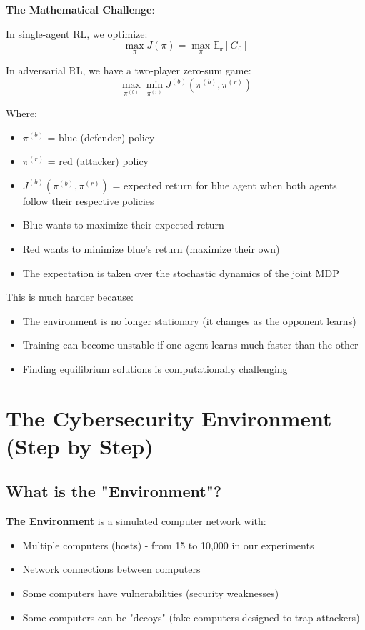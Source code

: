 \documentclass[11pt]{article}
\begin{document}
\begin{mathdetails}
\textbf{The Mathematical Challenge}:

In single-agent RL, we optimize:
$$\max_{\pi} J(\pi) = \max_{\pi} \mathbb{E}_{\pi}\left[G_0\right]$$

In adversarial RL, we have a two-player zero-sum game:
$$\max_{\pi^{(b)}} \min_{\pi^{(r)}} J^{(b)}(\pi^{(b)}, \pi^{(r)})$$

Where:
\begin{itemize}
\item $\pi^{(b)}$ = blue (defender) policy
\item $\pi^{(r)}$ = red (attacker) policy  
\item $J^{(b)}(\pi^{(b)}, \pi^{(r)})$ = expected return for blue agent when both agents follow their respective policies
\item Blue wants to maximize their expected return
\item Red wants to minimize blue's return (maximize their own)
\item The expectation is taken over the stochastic dynamics of the joint MDP
\end{itemize}

This is much harder because:
\begin{itemize}
\item The environment is no longer stationary (it changes as the opponent learns)
\item Training can become unstable if one agent learns much faster than the other
\item Finding equilibrium solutions is computationally challenging
\end{itemize}
\end{mathdetails}

\section{The Cybersecurity Environment (Step by Step)}

\subsection{What is the "Environment"?}

\begin{foundation}
\textbf{The Environment} is a simulated computer network with:
\begin{itemize}
\item Multiple computers (hosts) - from 15 to 10,000 in our experiments
\item Network connections between computers
\item Some computers have vulnerabilities (security weaknesses)
\item Some computers can be "decoys" (fake computers designed to trap attackers)
\end{itemize}
\end{foundation}
\end{document}
